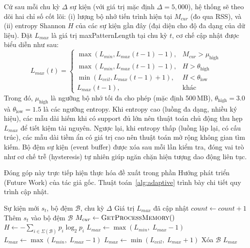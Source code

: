 \documentclass{article}
\begin{document}
Cứ sau mỗi chu kỳ $\Delta$ sự kiện (với giá trị mặc định $\Delta = 5{,}000$), hệ thống sẽ theo dõi hai chỉ số cốt lõi: (i) lượng bộ nhớ tiến trình hiện tại $M_{cur}$ (đo qua RSS), và (ii) entropy Shannon $H$ của các sự kiện gần đây (đại diện cho độ đa dạng của dữ liệu). Đặt $L_{max}$ là giá trị maxPatternLength tại chu kỳ $t$, cơ chế cập nhật được biểu diễn như sau:
\begin{equation}
    L_{max}(t) \!=\! \begin{cases} 
      \max(L_{min}, L_{max}(t\!-\!1) \!-\! 1), & M_{cur} \!>\! \mu_{\text{high}} \\
      \max(L_{min}, L_{max}(t\!-\!1) \!-\! 1), & H \!>\! \theta_{\text{high}} \\
      \min(L_{ceil}, L_{max}(t\!-\!1) \!+\! 1), & H \!<\! \theta_{\text{low}} \\
      L_{max}(t\!-\!1), & \text{khác}
   \end{cases}
\end{equation}
Trong đó, $\mu_{\text{high}}$ là ngưỡng bộ nhớ tối đa cho phép (mặc định 500\,MB), $\theta_{\text{high}} = 3.0$ và $\theta_{\text{low}} = 1.5$ là các ngưỡng entropy. Khi entropy cao (luồng đa dạng, nhiều ký hiệu), các mẫu dài hiếm khi có support đủ lớn nên thuật toán chủ động thu hẹp $L_{max}$ để tiết kiệm tài nguyên. Ngược lại, khi entropy thấp (luồng lặp lại, có cấu trúc), các mẫu dài tiềm ẩn có giá trị cao nên thuật toán mở rộng không gian tìm kiếm. Bộ đệm sự kiện (event buffer) được xóa sau mỗi lần kiểm tra, đóng vai trò như cơ chế trễ (hysteresis) tự nhiên giúp ngăn chặn hiện tượng dao động liên tục. 

Đóng góp này trực tiếp hiện thực hóa đề xuất trong phần Hướng phát triển (Future Work) của tác giả gốc. Thuật toán~\ref{alg:adaptive} trình bày chi tiết quy trình cập nhật.

\begin{algorithm}[!ht]
\caption{Cập nhật maxPatternLength Thích ứng}
\label{alg:adaptive}
\small
\begin{algorithmic}[1]
\REQUIRE Sự kiện mới $s_t$, bộ đệm $\mathcal{B}$, chu kỳ $\Delta$
\ENSURE Giá trị $L_{max}$ đã cập nhật
\STATE $\textit{count} \leftarrow \textit{count} + 1$
\STATE Thêm $s_t$ vào bộ đệm $\mathcal{B}$
    \STATE $M_{cur} \leftarrow \textsc{GetProcessMemory}()$ 
    \STATE $H \leftarrow -\sum_{i \in \Sigma(\mathcal{B})} p_i \log_2 p_i$ 
        \STATE $L_{max} \leftarrow \max(L_{min},\; L_{max} - 1)$ 
        \STATE $L_{max} \leftarrow \max(L_{min},\; L_{max} - 1)$ 
        \STATE $L_{max} \leftarrow \min(L_{ceil},\; L_{max} + 1)$ 
    \ENDIF
    \STATE Xóa $\mathcal{B}$ 
\ENDIF
\RETURN $L_{max}$
\end{algorithmic}
\end{algorithm}
\end{document}
